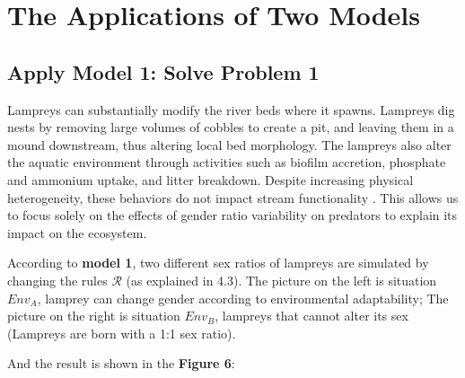 \documentclass{mcmthesis}
\begin{document}
\section{The Applications of Two Models}
\subsection{Apply Model 1: Solve Problem 1}
Lampreys can substantially modify the river beds where it spawns. Lampreys dig nests by removing large volumes of cobbles to create a pit, and leaving them in a mound downstream, thus altering local bed morphology. The lampreys also alter the aquatic environment through activities such as biofilm accretion, phosphate and ammonium uptake, and litter breakdown. Despite increasing physical heterogeneity, these behaviors do not impact stream functionality \cite{8}. This allows us to focus solely on the effects of gender ratio variability on predators to explain its impact on the ecosystem.

According to \textbf{model 1}, two different sex ratios of lampreys are simulated by changing the rules ${\displaystyle {\mathcal {R}}}$ (as explained in 4.3). The picture on the left is situation $Env_{A}$, lamprey can change gender according to environmental adaptability; The picture on the right is situation $Env_{B}$, lampreys that cannot alter its sex (Lampreys are born with a 1:1 sex ratio). 

And the result is shown in the \textbf{Figure 6}:
\end{document}
